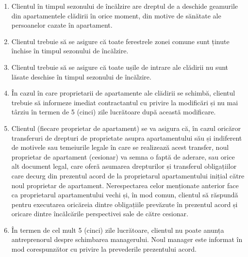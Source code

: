\begin{multicols}{2}
\begin{enumerate}
\item Clientul în timpul sezonului de încălzire are dreptul de a deschide geamurile din apartamentele clădirii în orice moment, din motive de sănătate ale persoanelor cazate în apartament.
\item Clientul trebuie să se asigure că toate ferestrele zonei comune sunt ținute închise în timpul sezonului de încălzire.
\item Clientul trebuie să se asigure că toate ușile de intrare ale clădirii nu sunt lăsate deschise în timpul sezonului de încălzire.
\item În cazul în care proprietarii de apartamente ale clădirii se schimbă, clientul trebuie să informeze imediat contractantul cu privire la modificări și nu mai târziu în termen de 5 (cinci) zile lucrătoare după această modificare.
\item Clientul (fiecare proprietar de apartament) se va asigura că, în cazul oricăror transferuri de drepturi de proprietate asupra apartamentului său și indiferent de motivele sau temeiurile legale în care se realizează acest transfer, noul proprietar de apartament (cesionar) va semna o faptă de aderare, sau orice alt document legal, care oferă asumarea drepturilor și transferul obligațiilor care decurg din prezentul acord de la proprietarul apartamentului inițial către noul proprietar de apartament. Nerespectarea celor menționate anterior face ca proprietarul apartamentului vechi și, în mod comun, clientul să răspundă pentru executarea oricăreia dintre obligațiile prevăzute în prezentul acord și oricare dintre încălcările perspectivei sale de către cesionar.
\item În termen de cel mult 5 (cinci) zile lucrătoare, clientul nu poate anunța antreprenorul despre schimbarea managerului. Noul manager este informat în mod corespunzător cu privire la prevederile prezentului acord.
\end{enumerate}


\end{multicols}
